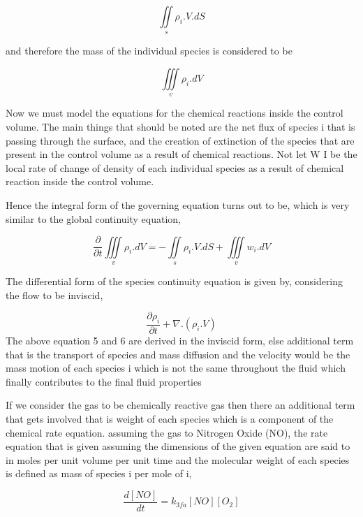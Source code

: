 \vspace{3mm}
\[\iint\limits_s \rho_i.V.dS\]

\vspace{3mm}and therefore the mass of the individual species is considered to be 

\large \vspace{3mm} \[\iiint\limits_v \rho_i.dV\]
\vspace{3mm}

Now we must model the equations for the chemical reactions inside the control volume. The main things that should be noted are the net flux of species i that is passing through the surface, and the creation of extinction of the species that are present in the control volume as a result of chemical reactions. Not let W I be the local rate of change of density of each individual
species as a result of chemical reaction inside the control volume.

Hence the integral form of the governing equation turns out to be, which is very similar to the global continuity equation, 
\vspace{3mm}

\[\frac{\partial}{\partial t} \iiint\limits_v \rho_i.dV = -\iint\limits_s \rho_i.V.dS+\iiint\limits_v w_i.dV\] 

\vspace{3mm}
The differential form of the species continuity equation is given by, considering the flow to be inviscid, 

\large\vspace{3mm}\[\frac{\partial \rho_i }{\partial t} + \nabla .(\rho_i.V)\]
\vspace{3mm}
The above equation 5 and 6 are derived in the inviscid form, else additional term that is the transport of species and mass diffusion and the velocity would be the mass motion of each species i which is not the same throughout the fluid which finally contributes to the final fluid properties

If we consider the gas to be chemically reactive gas then there an additional term that gets involved that is weight of each species which is a component of the chemical rate equation. assuming the gas to Nitrogen Oxide (NO), the rate equation that is given assuming the dimensions of the given equation are said to in moles per unit volume per unit time and the molecular weight of each species is defined as mass of species i per mole of i, \vspace{3mm} 

 \large\[\frac{d[NO]}{dt} = k_{3fa}[NO][O_2]\] \vspace{3mm}

